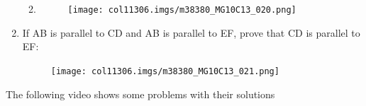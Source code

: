 \begin{table}[H]
\begin{enumerate}[noitemsep, label=\textbf{\arabic*}. ]
\begin{enumerate}[noitemsep, label=\textbf{\alph*}. ]
\begin{figure}[H]
\begin{center}
      \vspace{2pt}
    \vspace{.1in}
    
    \end{center}

 \end{figure}   

    \addtocounter{footnote}{-0}
    \item 

    \setcounter{subfigure}{0}


	\begin{figure}[H] %
    \begin{center}
    \label{m38380*id317384!!!underscore!!!media}\label{m38380*id317384!!!underscore!!!printimage}\texttt{[image: col11306.imgs/m38380\_MG10C13\_020.png]} %
        
      \vspace{2pt}
    \vspace{.1in}
    
    \end{center}

 \end{figure}   

    \addtocounter{footnote}{-0}
    \end{enumerate}
                \item If AB is parallel to CD and AB is parallel to EF, prove that CD is parallel to EF:


    \setcounter{subfigure}{0}


	\begin{figure}[H] %
    \begin{center}
    \label{m38380*id317408!!!underscore!!!media}\label{m38380*id317408!!!underscore!!!printimage}\texttt{[image: col11306.imgs/m38380\_MG10C13\_021.png]} %
        
      \vspace{2pt}
    \vspace{.1in}
    
    \end{center}

 \end{figure}   

    \addtocounter{footnote}{-0}
            \end{enumerate}
        \label{m38380*eip-115}The following video shows some problems with their solutions



\end{table}

